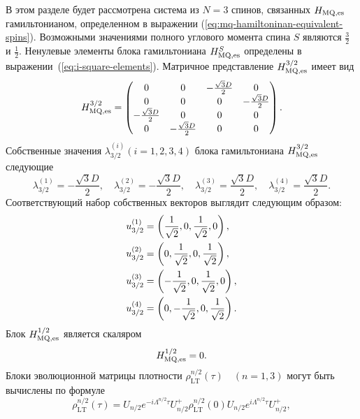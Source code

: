В этом разделе будет рассмотрена система из $N=3$ спинов,
связанных $H_\mathrm{MQ,es}$ гамильтонианом,
определенном в выражении (\ref{eq:mq-hamiltoninan-equivalent-spins}).
Возможными значениями полного углового момента спина $S$
являются $\frac 3 2$ и $\frac 1 2$.
Ненулевые элементы блока гамильтониана $H_\mathrm{MQ,es}^{S}$ определены в выражении~(\ref{eq:i-square-elements}).
Матричное представление $H_\mathrm{MQ,es}^{3/2}$ имеет вид
%
\begin{equation}
    \label{eq:ham_3_2}
    H_\mathrm{MQ,es}^{3/2} =
    \begin{pmatrix}
        0 & 0 & -\frac{\sqrt{3} D}{2} & 0 \\
        0 & 0 & 0 & -\frac{\sqrt{3} D}{2} \\
        -\frac{\sqrt{3} D}{2} & 0 & 0 & 0 \\
        0 & -\frac{\sqrt{3} D}{2} & 0 & 0
    \end{pmatrix}.
\end{equation}
%
Собственные значения $\lambda_{3/2}^{(i)}(i=1, 2, 3, 4)$
блока гамильтониана $H_\mathrm{MQ,es}^{3/2}$ следующие
%
\begin{equation}\label{eq:eigvals_3_2}
  \lambda_{3/2}^{(1)} = -\frac{\sqrt{3} D}{2}, \quad
  \lambda_{3/2}^{(2)} = -\frac{\sqrt{3} D}{2}, \quad
  \lambda_{3/2}^{(3)} = \frac{\sqrt{3} D}{2}, \quad
  \lambda_{3/2}^{(4)} = \frac{\sqrt{3} D}{2}.
\end{equation}
%
Соответствующий набор собственных векторов выглядит следующим образом:
%
\begin{align}\label{eq:eigvecs_3_2}
  u_{3/2}^{(1)} & =  \left(\frac{1}{\sqrt{2}}, 0, \frac{1}{\sqrt{2}}, 0\right) ,
  \notag \\
  u_{3/2}^{(2)} & =  \left(0, \frac{1}{\sqrt{2}}, 0, \frac{1}{\sqrt{2}}\right) ,
  \notag \\
  u_{3/2}^{(3)} & =  \left(-\frac{1}{\sqrt{2}}, 0, \frac{1}{\sqrt{2}}, 0\right) ,
  \notag \\
  u_{3/2}^{(4)} & =  \left(0, -\frac{1}{\sqrt{2}}, 0, \frac{1}{\sqrt{2}}\right) .
\end{align}
%
Блок $H_\mathrm{MQ,es}^{1/2}$ является скаляром
%
\begin{equation}\label{eq:ham_1_2}
  H_\mathrm{MQ,es}^{1/2} = 0.
\end{equation}
%
Блоки эволюционной матрицы плотности $\rho_\mathrm{LT}^{n/2}(\tau) \quad (n = 1, 3)$
могут быть вычислены по формуле
%
\begin{equation}\label{eq:liouvile_sol}
  \rho_\mathrm{LT}^{n/2}(\tau) =
  U_{n/2} e^{-i\Lambda^{n/2}\tau} U^{+}_{n/2}
  \rho^{n/2}_\mathrm{LT}(0)
  U_{n/2} e^{i\Lambda^{n/2}\tau} U^{+}_{n/2},
\end{equation}
